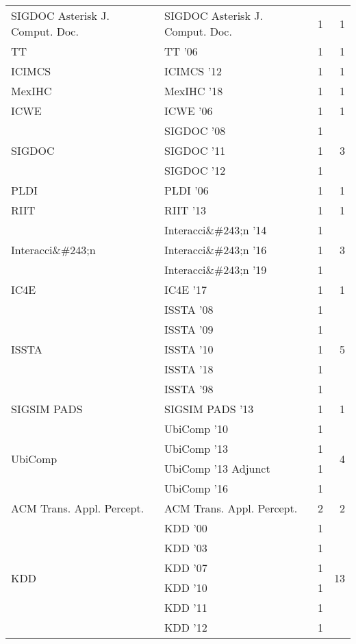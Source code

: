 \begin{table*}[t]
\begin{tabular}{llrr}
\multirow{1}{*}{SIGDOC Asterisk J. Comput. Doc.} & SIGDOC Asterisk J. Comput. Doc. & 1 & \multirow{1}{*}{1}\\
\multirow{1}{*}{TT } & TT '06 & 1 & \multirow{1}{*}{1}\\
\multirow{1}{*}{ICIMCS } & ICIMCS '12 & 1 & \multirow{1}{*}{1}\\
\multirow{1}{*}{MexIHC } & MexIHC '18 & 1 & \multirow{1}{*}{1}\\
\multirow{1}{*}{ICWE } & ICWE '06 & 1 & \multirow{1}{*}{1}\\
\multirow{3}{*}{SIGDOC } & SIGDOC '08 & 1 & \multirow{3}{*}{3}\\
& SIGDOC '11 & 1 &\\
& SIGDOC '12 & 1 &\\
\multirow{1}{*}{PLDI } & PLDI '06 & 1 & \multirow{1}{*}{1}\\
\multirow{1}{*}{RIIT } & RIIT '13 & 1 & \multirow{1}{*}{1}\\
\multirow{3}{*}{Interacci\&\#243;n } & Interacci\&\#243;n '14 & 1 & \multirow{3}{*}{3}\\
& Interacci\&\#243;n '16 & 1 &\\
& Interacci\&\#243;n '19 & 1 &\\
\multirow{1}{*}{IC4E } & IC4E '17 & 1 & \multirow{1}{*}{1}\\
\multirow{5}{*}{ISSTA } & ISSTA '08 & 1 & \multirow{5}{*}{5}\\
& ISSTA '09 & 1 &\\
& ISSTA '10 & 1 &\\
& ISSTA '18 & 1 &\\
& ISSTA '98 & 1 &\\
\multirow{1}{*}{SIGSIM PADS } & SIGSIM PADS '13 & 1 & \multirow{1}{*}{1}\\
\multirow{4}{*}{UbiComp } & UbiComp '10 & 1 & \multirow{4}{*}{4}\\
& UbiComp '13 & 1 &\\
& UbiComp '13 Adjunct & 1 &\\
& UbiComp '16 & 1 &\\
\multirow{1}{*}{ACM Trans. Appl. Percept.} & ACM Trans. Appl. Percept. & 2 & \multirow{1}{*}{2}\\
\multirow{11}{*}{KDD } & KDD '00 & 1 & \multirow{11}{*}{13}\\
& KDD '03 & 1 &\\
& KDD '07 & 1 &\\
& KDD '10 & 1 &\\
& KDD '11 & 1 &\\
& KDD '12 & 1 &\\

\end{tabular}
\end{table*}
